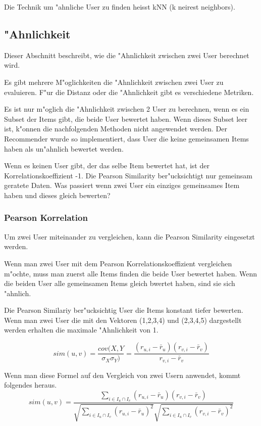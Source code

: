 \documentclass[a4paper, 12pt]{article}
\begin{document}
Die Technik um "ahnliche User zu finden heisst kNN (k neirest neighbors). 

\subsection{"Ahnlichkeit}

Dieser Abschnitt beschreibt, wie die "Ahnlichkeit zwischen zwei User berechnet wird. 

Es gibt mehrere M"oglichkeiten die "Ahnlichkeit zwischen zwei User zu evaluieren. F"ur die Distanz oder die "Ahnlichkeit gibt es verschiedene Metriken. 

Es ist nur m"oglich die "Ahnlichkeit zwischen 2 User zu berechnen, wenn es ein Subset der Items gibt, die beide User bewertet haben. Wenn dieses Subset leer ist, k"onnen die nachfolgenden Methoden nicht angewendet werden. Der Recommender wurde so implementiert, dass User die keine gemeinsamen Items haben als un"ahnlich bewertet werden.

Wenn es keinen User gibt, der das selbe Item bewertet hat, ist der Korrelationskoeffizient -1.
Die Pearson Similarity ber"ucksichtigt nur gemeinsam geratete Daten.
Was passiert wenn zwei User ein einziges gemeinsames Item haben und dieses gleich bewerten?

\subsubsection{Pearson Korrelation}
\label{sec:pearsoncorrelation}

Um zwei User miteinander zu vergleichen, kann die Pearson Similarity eingesetzt werden.

Wenn man zwei User mit dem Pearson Korrelationskoeffizient vergleichen m"ochte, muss man zuerst alle Items finden die beide User bewertet haben. Wenn die beiden User alle gemeinsamen Items gleich bwertet haben, sind sie sich "ahnlich.

Die Pearson Similariy ber"ucksichtig User die Items konstant tiefer bewerten. Wenn man zwei User die mit den Vektoren (1,2,3,4) und (2,3,4,5) dargestellt werden erhalten die maximale "Ahnlichkeit von 1.

\begin{equation}
 sim(u,v) = \frac{cov(X,Y}{\sigma_X \sigma_Y)} = \frac{(r_{u,i} - \bar{r}_u)(r_{v,i} - \bar{r}_v)}{r_{v,i} - \bar{r}_v}    
\end{equation}

Wenn man diese Formel auf den Vergleich von zwei Usern anwendet, kommt folgendes heraus.
\begin{equation}
 sim(u,v) = \frac{\sum_{i \in I_u \cap I_v} (r_{u,i} - \bar{r}_u)(r_{v,i} - \bar{r}_v)}{\sqrt{\sum_{i \in I_u \cap I_v}(r_{u,i} - \bar{r}_u)^2}\sqrt{\sum_{i \in I_u \cap I_v}(r_{v,i} - \bar{r}_v)^2}}
\end{equation}
\end{document}
